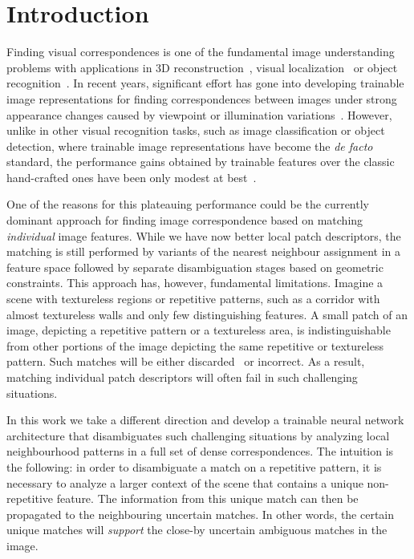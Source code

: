 \documentclass{article}
\begin{document}
\section{Introduction \label{sec:intro}}

Finding visual correspondences is one of the fundamental image understanding problems with applications in 3D reconstruction~\cite{agarwal2011building}, visual localization~\cite{Sattler18,Taira18} or object recognition~\cite{liu2008siftflow}. In recent years, significant effort has gone into developing trainable image representations for finding correspondences between images under strong appearance changes caused by viewpoint or illumination variations~\cite{jahrer2008learned, fischer2014descriptor, zagoruyko2015learning, han2015matchnet, balntas2016pn, ConvOpt,DeepDesc,TFeat,yi2016lift}. However, unlike in other visual recognition tasks, such as image classification or object detection, where trainable image representations have become the \emph{de facto} standard, the performance gains obtained by trainable features over the classic hand-crafted ones have been only modest at best~\cite{Schonberger_2017_CVPR}.

One of the reasons for this plateauing performance could be the currently dominant approach for finding image correspondence based on matching  {\em individual} image features. 
While we have now better local patch descriptors, the matching is still performed by variants of the nearest neighbour assignment in a feature space followed by separate disambiguation stages based on geometric constraints. This approach has, however, fundamental limitations. Imagine a scene with textureless regions or repetitive patterns, such as a corridor with almost textureless walls and only few distinguishing features.
A small patch of an image, depicting a repetitive pattern or a textureless area, is indistinguishable from other portions of the image depicting the same repetitive or textureless pattern. Such matches will be either discarded~\cite{lowe2004distinctive} or incorrect. As a result, matching individual patch descriptors will often fail in such challenging situations. 


In this work we take a different direction and develop a trainable neural network architecture that disambiguates such challenging situations by analyzing local neighbourhood patterns in a full set of dense correspondences. The intuition is the following: in order to disambiguate a match on a repetitive pattern, it is necessary to analyze a larger context of the scene that contains a unique non-repetitive feature. The information from this unique match can then be propagated to the neighbouring uncertain matches. 
In other words, the certain unique matches will \emph{support} the close-by uncertain ambiguous matches in the image.
\end{document}
